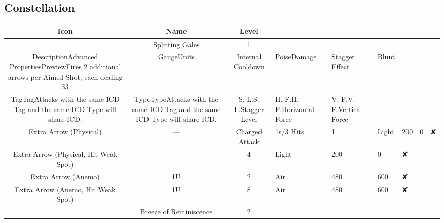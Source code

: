 \documentclass[a4paper,12pt]{article}
\begin{document}
\subsection*{Constellation}\n\n\begin{tabular}{|c|c|c|} \hline
Icon & Name & Level \\
 \hline
 & Splitting Gales & 1 \\
DescriptionAdvanced PropertiesPreviewFires 2 additional arrows per Aimed Shot, each dealing 33%
 & GaugeUnits & Internal Cooldown & PoiseDamage & Stagger Effect & Blunt \\
TagTagAttacks with the same ICD Tag and the same ICD Type will share ICD. & TypeTypeAttacks with the same ICD Tag and the same ICD Type will share ICD. & S. L.S. L.Stagger Level & H. F.H. F.Horizontal Force & V. F.V. F.Vertical Force \\
Extra Arrow (Physical) & — & Charged Attack & 1s/3 Hits & 1 & Light & 200 & 0 & ✘ \\
Extra Arrow (Physical, Hit Weak Spot) & — & 4 & Light & 200 & 0 & ✘ \\
Extra Arrow (Anemo) & 1U & 2 & Air & 480 & 600 & ✘ \\
Extra Arrow (Anemo, Hit Weak Spot) & 1U & 8 & Air & 480 & 600 & ✘ \\
 & Breeze of Reminiscence & 2 \\

\end{tabular}
\end{document}
